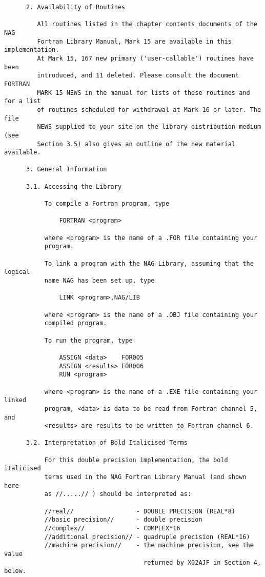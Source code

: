 \begin{small}
\begin{verbatim}
      2. Availability of Routines

         All routines listed in the chapter contents documents of the NAG
         Fortran Library Manual, Mark 15 are available in this implementation.
         At Mark 15, 167 new primary ('user-callable') routines have been
         introduced, and 11 deleted. Please consult the document FORTRAN
         MARK 15 NEWS in the manual for lists of these routines and for a list
         of routines scheduled for withdrawal at Mark 16 or later. The file
         NEWS supplied to your site on the library distribution medium (see
         Section 3.5) also gives an outline of the new material available.

      3. General Information

      3.1. Accessing the Library

           To compile a Fortran program, type

               FORTRAN <program>

           where <program> is the name of a .FOR file containing your
           program.

           To link a program with the NAG Library, assuming that the logical
           name NAG has been set up, type

               LINK <program>,NAG/LIB

           where <program> is the name of a .OBJ file containing your
           compiled program.

           To run the program, type

               ASSIGN <data>    FOR005
               ASSIGN <results> FOR006
               RUN <program>

           where <program> is the name of a .EXE file containing your linked
           program, <data> is data to be read from Fortran channel 5, and
           <results> are results to be written to Fortran channel 6.

      3.2. Interpretation of Bold Italicised Terms

           For this double precision implementation, the bold italicised
           terms used in the NAG Fortran Library Manual (and shown here
           as //.....// ) should be interpreted as:

           //real//                 - DOUBLE PRECISION (REAL*8)
           //basic precision//      - double precision
           //complex//              - COMPLEX*16
           //additional precision// - quadruple precision (REAL*16)
           //machine precision//    - the machine precision, see the value
                                      returned by X02AJF in Section 4, below.


\end{verbatim}
\end{small}
